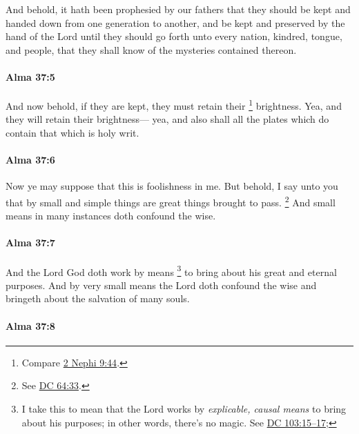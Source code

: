			And behold, it hath been prophesied by our fathers
			that they should be kept and handed down from one generation to another,
			and be kept and preserved by the hand of the Lord
			until they should go forth unto every nation, kindred, tongue, and people,
			that they shall know of the mysteries contained thereon.

		\paragraph{Alma 37:5} %
			\label{ALMA-37-5}

			And now behold, if they are kept, they must retain their
				\footnote{%
					Compare \hyperref[2NEPHI-9-44]{2 Nephi 9:44}.
					}%
			brightness.
			Yea, and they will retain their brightness---
			yea, and also shall all the plates which do contain that which is holy writ.

		\paragraph{Alma 37:6} %
			\label{ALMA-37-6}

			Now ye may suppose that this is foolishness in me.
			But behold, I say unto you
			that by small and simple things are great things brought to pass.%
				\footnote{%
					See \hyperref[DC64-33]{DC 64:33}.
					}
			And small means in many instances doth confound the wise.

		\paragraph{Alma 37:7} %
			\label{ALMA-37-7}

			And the Lord God doth work by means%
				\footnote{%
					I take this to mean that the Lord works by \textit{explicable, causal means} to bring about his purposes; in other words, there's no magic. See \hyperref[DC103-15]{DC 103:15--17}; 
					}
			to bring about his great and eternal purposes.
			And by very small means the Lord doth confound the wise
			and bringeth about the salvation of many souls.

		\paragraph{Alma 37:8} %
			\label{ALMA-37-8}

